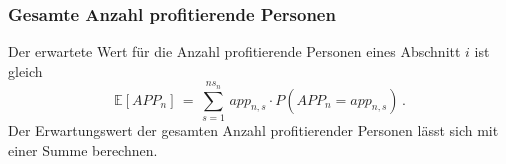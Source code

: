 \subsubsection*{Gesamte Anzahl profitierende Personen}
Der erwartete Wert für die Anzahl profitierende Personen eines Abschnitt $i$ ist gleich
\begin{equation*}
	\mathbb{E}[APP_n]\,=\,\sum_{s=1}^{ns_n}\, app_{n,s}\cdot P(APP_n=app_{n,s})\,.
\end{equation*}
Der Erwartungswert der gesamten Anzahl profitierender Personen lässt sich mit einer Summe berechnen. 

\newpage
\printbibliography

%
